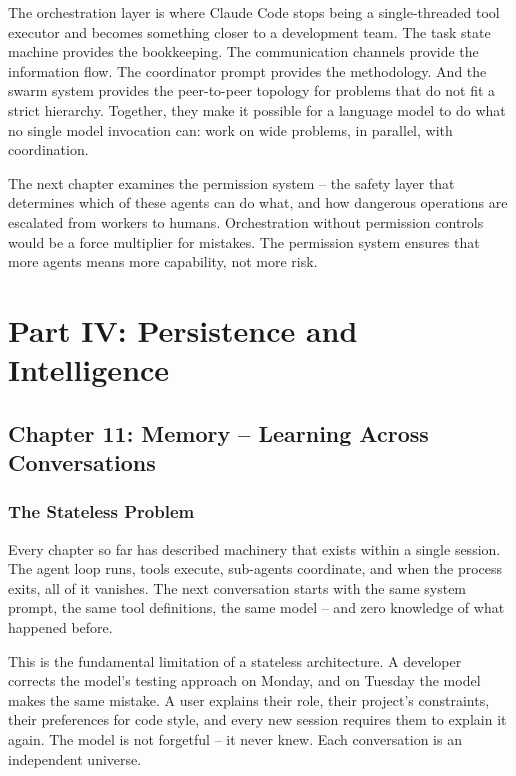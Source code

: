 \documentclass[
  english,
  11pt,
  letterpaper,
]{book}
\begin{document}
The orchestration layer is where Claude Code stops being a
single-threaded tool executor and becomes something closer to a
development team. The task state machine provides the bookkeeping. The
communication channels provide the information flow. The coordinator
prompt provides the methodology. And the swarm system provides the
peer-to-peer topology for problems that do not fit a strict hierarchy.
Together, they make it possible for a language model to do what no
single model invocation can: work on wide problems, in parallel, with
coordination.

The next chapter examines the permission system -- the safety layer that
determines which of these agents can do what, and how dangerous
operations are escalated from workers to humans. Orchestration without
permission controls would be a force multiplier for mistakes. The
permission system ensures that more agents means more capability, not
more risk.

\part{Part IV: Persistence and Intelligence}

\chapter{Chapter 11: Memory -- Learning Across
Conversations}\label{chapter-11-memory-learning-across-conversations}

\section{The Stateless Problem}\label{the-stateless-problem}

Every chapter so far has described machinery that exists within a single
session. The agent loop runs, tools execute, sub-agents coordinate, and
when the process exits, all of it vanishes. The next conversation starts
with the same system prompt, the same tool definitions, the same model
-- and zero knowledge of what happened before.

This is the fundamental limitation of a stateless architecture. A
developer corrects the model's testing approach on Monday, and on
Tuesday the model makes the same mistake. A user explains their role,
their project's constraints, their preferences for code style, and every
new session requires them to explain it again. The model is not
forgetful -- it never knew. Each conversation is an independent
universe.
\end{document}
